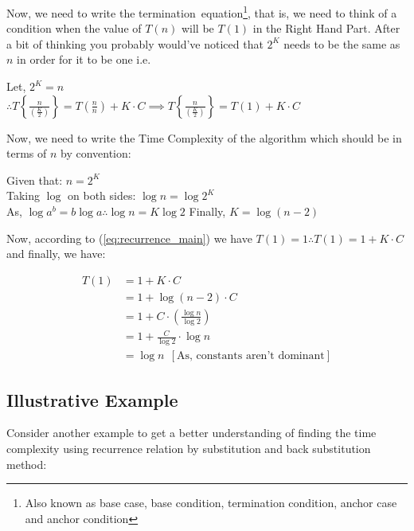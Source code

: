 \documentclass[a4paper,12pt]{article}
\theoremstyle{definition}
\begin{document}
    \noindent
    Now, we need to write the termination~equation\footnote{Also known as base case, base condition, termination
    condition, anchor case and anchor condition}, that is, we need to think of a condition when the value of $T(n)$
    will be $T(1)$ in the Right Hand Part. After a bit of thinking you probably would've noticed that $2^K$ needs to
    be the same as $n$ in order for it to be one i.e.

    \begin{center}
        Let, $2^K = n$\\
        $\therefore T\left\{\frac{n}{\left(\frac{K}{2}\right)}\right\} = T(\frac{n}{n}) +
        K \cdot C \implies T\left\{\frac{n}{\left(\frac{K}{2}\right)}\right\} = T(1) + K \cdot C$
    \end{center}

    \noindent
    Now, we need to write the Time Complexity of the algorithm which should be in terms of $n$ by convention:

    \begin{center}
        Given that: $n = 2^K$\\
        Taking $\log$ on both sides: $\log n = \log 2^K$\\
        As, $\log a^b = b\log a \therefore \log n = K\log 2$
        Finally, $K = \log \left(n - 2\right)$
    \end{center}

    \noindent
    Now, according to (\ref{eq:recurrence_main}) we have $T(1) = 1 \therefore T(1) = 1 + K \cdot C$ and finally,
    we have:

    \begin{align*}
        T(1) & = 1 + K \cdot C                               \\
        & = 1 + \log \left(n - 2\right) \cdot C              \\
        & = 1 + C \cdot \left(\frac{\log n}{\log 2}\right)   \\
        & = 1 + \frac{C}{\log 2} \cdot \log n                \\
        & = \log n\ \ [\text{As, constants aren't dominant}]
    \end{align*}

    \subsection*{Illustrative Example}

    Consider another example to get a better understanding of finding the time complexity using recurrence relation
    by substitution and back substitution method:
\end{document}
